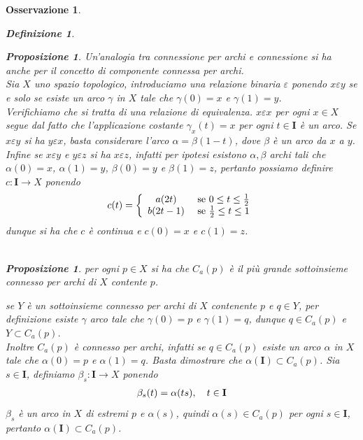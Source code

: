 \documentclass[oneside, 11pt]{amsbook}
\makeatletter
\newcommand{\0}{{(0)}}
\newcommand{\3}{{(3)}}
\theoremstyle{colonplain}
\newtheorem{prop}[thm]{Proposizione}
\theoremstyle{colondefinition}
\newtheorem{defn}[thm]{Definizione}
\theoremstyle{colonremark}
\newtheorem{rmk}[thm]{Osservazione}
\numberwithin{equation}{chapter}
\renewcommand{\proofname}{Dimostrazione}
\renewenvironment{proof}[1][\proofname]{\par
  \pushQED{\end{proof}}%
  \normalfont \topsep6\p@\@plus6\p@\relax
  \trivlist
  \item[\hskip\labelsep\bfseries #1:]\ignorespaces
}{%
  \popQED\endtrivlist\@endpefalse
}
\makeatother
\begin{document}
\begin{rmk}
\begin{defn}
\begin{prop}
\begin{proof}
\end{proof}
Un'analogia tra connessione per archi e connessione si ha anche per il concetto di \textit{componente connessa per archi}. \\
Sia $X$ uno spazio topologico, introduciamo una relazione binaria $\varepsilon$ ponendo $x \varepsilon y$ se e solo se esiste un arco $\gamma$ in $X$ tale che $\gamma(0) = x$ e $\gamma (1) = y$. \\
Verifichiamo che si tratta di una relazione di equivalenza. $x \varepsilon x$ per ogni $x \in X$ segue dal fatto che l'applicazione costante $\gamma_x(t) = x$ per ogni $t \in \mathbf{I}$ è un arco. Se $x \varepsilon y$ si ha $y \varepsilon x$, basta considerare l'arco $\alpha = \beta (1 - t)$, dove $\beta$ è un arco da $x$ a $y$. Infine se $x \varepsilon y$ e $y \varepsilon z$ si ha $x \varepsilon z$, infatti per ipotesi esistono $\alpha, \beta$ archi tali che $\alpha(0) = x$, $\alpha(1) = y$, $\beta(0) = y$ e $\beta(1) = z$, pertanto possiamo definire $c : \mathbf{I} \longrightarrow X$ ponendo
\begin{align}
    c(t) = \left\{ \begin{array}{cc}
         a(2t)& \text{ se } 0 \leq t \leq \frac{1}{2}  \\
         b(2t - 1)& \text{ se } \frac{1}{2} \leq t \leq 1 \notag
    \end{array} \right.
\end{align}
dunque si ha che $c$ è continua e $c(0) = x$ e $c(1) = z$.\\ \\
\begin{prop}
per ogni $p \in X$ si ha che $C_a(p)$ è il più grande sottoinsieme connesso per archi di $X$ contente $p$.
\end{prop}
\begin{proof} 
se $Y$ è un sottoinsieme connesso per archi di $X$ contenente $p$ e $q \in Y$, per definizione esiste $\gamma$ arco tale che $\gamma(0) = p$ e $\gamma(1) = q$, dunque $q \in C_a(p)$ e $Y \subset C_a(p)$. \\
Inoltre $C_a(p)$ è connesso per archi, infatti se $q \in C_a(p)$ esiste un arco $\alpha$ in $X$ tale che $\alpha(0) = p$ e $\alpha(1) = q$. Basta dimostrare che $\alpha(\mathbf{I}) \subset C_a(p)$. Sia $s \in \mathbf{I}$, definiamo $\beta_s : \mathbf{I} \longrightarrow X$ ponendo
\begin{align}
    \beta_s(t) = \alpha(ts), \quad t \in \mathbf{I} \notag
\end{align}
$\beta_s$ è un arco in $X$ di estremi $p$ e $\alpha(s)$, quindi $\alpha(s) \in C_a(p)$ per ogni $s \in \mathbf{I}$, pertanto $\alpha(\mathbf{I}) \subset C_a(p)$. \end{proof}

\end{prop}
\end{defn}
\end{rmk}
\end{document}
